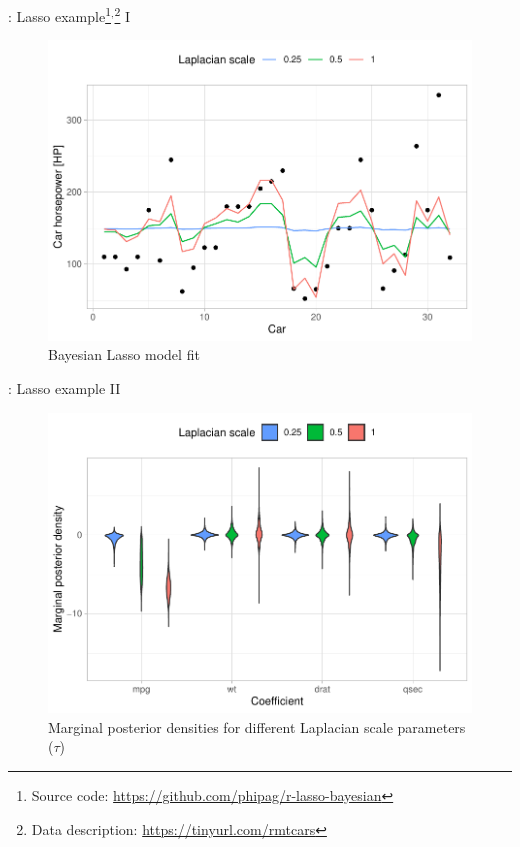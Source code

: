 \begin{frame}{: Lasso example\footnote{Source code: \url{https://github.com/phipag/r-lasso-bayesian}}$^\text{,}$\footnote{Data description: \url{https://tinyurl.com/rmtcars}} I}
    \begin{figure}
        \centering
        \includegraphics[width=\textwidth,height=.65\textheight,keepaspectratio]{plots/bayesian_lasso_fit.pdf}
        \caption{Bayesian Lasso model fit}
        \label{fig:bayesian_lasso_fit}
    \end{figure}
\end{frame}

\begin{frame}{: Lasso example II}
    \begin{figure}
        \centering
        \includegraphics[width=\textwidth,height=.65\textheight,keepaspectratio]{plots/bayesian_lasso_parameters.pdf}
        \caption{Marginal posterior densities for different Laplacian scale parameters ($\tau$)}
        \label{fig:bayesian_lasso_posteriors}
    \end{figure}
\end{frame}

